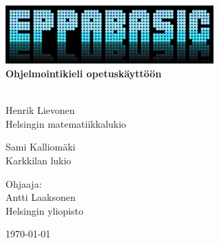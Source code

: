 \begin{titlepage}
	\begin{center}
		\vspace*{\fill}
	
		\includegraphics[width=0.6\textwidth]{logo}~\\[1cm]
		
		{\huge \bfseries Ohjelmointikieli opetuskäyttöön} \\[0.4cm]
		~\\
		{\large
		\begin{minipage}{0.5\linewidth}
		\centering
		Henrik Lievonen\\
		Helsingin matematiikkalukio
		\end{minipage}%
		\begin{minipage}{0.5\linewidth}
		\centering
		Sami Kalliomäki\\
		Karkkilan lukio
		\end{minipage}}
		
		\vspace*{50px}
		
		{Ohjaaja:\\
		Antti Laaksonen\\
		Helsingin yliopisto}
		
		{\today}
		
		\vfill		
	\end{center}
\end{titlepage}